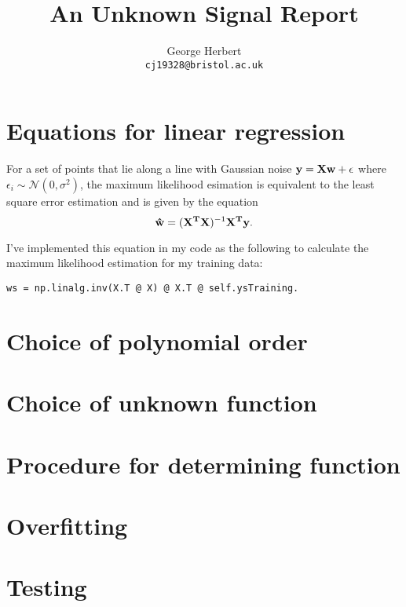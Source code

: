 \documentclass[onecolumn, 12pt, a4paper]{article}
\author{
  George Herbert\\
  \texttt{cj19328@bristol.ac.uk}
}
\title{An Unknown Signal Report}
\begin{document}
\maketitle

\section{Equations for linear regression}

For a set of points that lie along a line with Gaussian noise 
$\vb{y} = \vb{X}\vb{w} + \vb{\epsilon}$ where $\epsilon_{i} \sim \mathcal{N}(0, \sigma^{2})$,
the maximum likelihood esimation is equivalent to the least square 
error estimation and is given by the equation
\[
    \vb{\hat{w}} = (\vb{X^{T}}\vb{X})^{-1}\vb{X^{T}}\vb{y}.
\]

I've implemented this equation in my code as the following to calculate
the maximum likelihood estimation for my training data:
\begin{verbatim}
ws = np.linalg.inv(X.T @ X) @ X.T @ self.ysTraining.
\end{verbatim}

\section{Choice of polynomial order}

\section{Choice of unknown function}

\section{Procedure for determining function}

\section{Overfitting}

\section{Testing}
\end{document}
